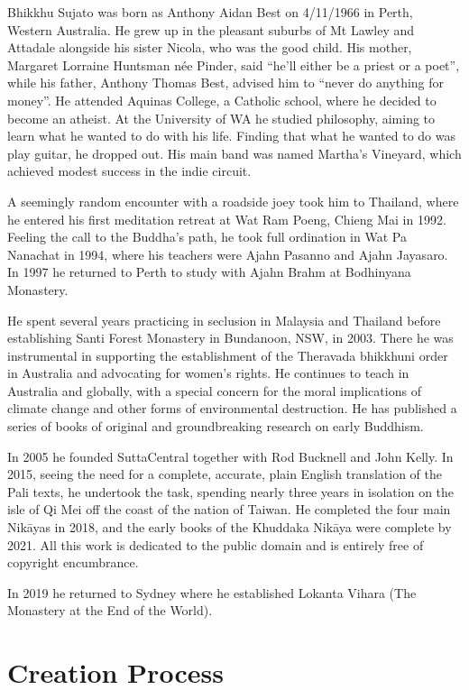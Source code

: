 \documentclass[12pt,openany]{book}%
\begin{document}
Bhikkhu Sujato was born as Anthony Aidan Best on 4/11/1966 in Perth, Western Australia. He grew up in the pleasant suburbs of Mt Lawley and Attadale alongside his sister Nicola, who was the good child. His mother, Margaret Lorraine Huntsman née Pinder, said “he’ll either be a priest or a poet”, while his father, Anthony Thomas Best, advised him to “never do anything for money”. He attended Aquinas College, a Catholic school, where he decided to become an atheist. At the University of WA he studied philosophy, aiming to learn what he wanted to do with his life. Finding that what he wanted to do was play guitar, he dropped out. His main band was named Martha’s Vineyard, which achieved modest success in the indie circuit. 

A seemingly random encounter with a roadside joey took him to Thailand, where he entered his first meditation retreat at Wat Ram Poeng, Chieng Mai in 1992. Feeling the call to the Buddha’s path, he took full ordination in Wat Pa Nanachat in 1994, where his teachers were Ajahn Pasanno and Ajahn Jayasaro. In 1997 he returned to Perth to study with Ajahn Brahm at Bodhinyana Monastery. 

He spent several years practicing in seclusion in Malaysia and Thailand before establishing Santi Forest Monastery in Bundanoon, NSW, in 2003. There he was instrumental in supporting the establishment of the Theravada bhikkhuni order in Australia and advocating for women’s rights. He continues to teach in Australia and globally, with a special concern for the moral implications of climate change and other forms of environmental destruction. He has published a series of books of original and groundbreaking research on early Buddhism. 

In 2005 he founded SuttaCentral together with Rod Bucknell and John Kelly. In 2015, seeing the need for a complete, accurate, plain English translation of the Pali texts, he undertook the task, spending nearly three years in isolation on the isle of Qi Mei off the coast of the nation of Taiwan. He completed the four main \textsanskrit{Nikāyas} in 2018, and the early books of the Khuddaka \textsanskrit{Nikāya} were complete by 2021. All this work is dedicated to the public domain and is entirely free of copyright encumbrance. 

In 2019 he returned to Sydney where he established Lokanta Vihara (The Monastery at the End of the World). 

\section*{Creation Process}
\end{document}
